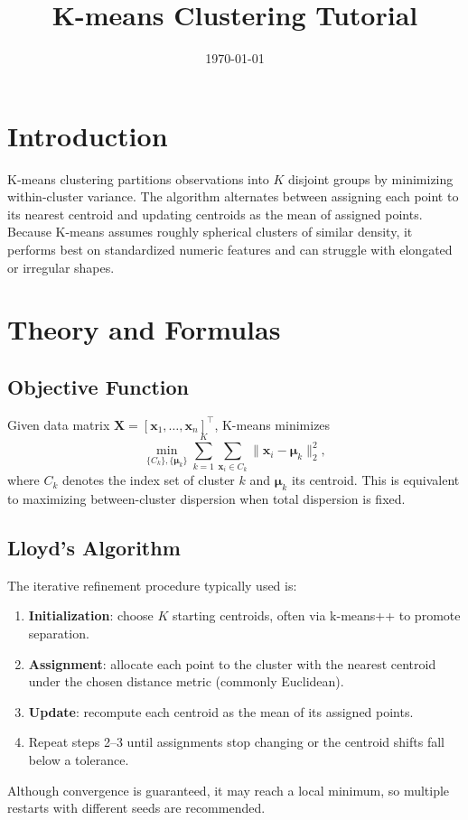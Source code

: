 ﻿\documentclass[12pt]{article}
\title{K-means Clustering Tutorial}
\author{}
\date{\today}
\begin{document}
\maketitle

\section{Introduction}
K-means clustering partitions observations into \(K\) disjoint groups by minimizing within-cluster variance. The algorithm alternates between assigning each point to its nearest centroid and updating centroids as the mean of assigned points. Because K-means assumes roughly spherical clusters of similar density, it performs best on standardized numeric features and can struggle with elongated or irregular shapes.

\section{Theory and Formulas}
\subsection{Objective Function}
Given data matrix \(\mathbf{X} = [\mathbf{x}_1,\dots,\mathbf{x}_n]^\top\), K-means minimizes
\begin{equation}
\min_{\{C_k\},\{\bm{\mu}_k\}} \sum_{k=1}^K \sum_{\mathbf{x}_i \in C_k} \lVert \mathbf{x}_i - \bm{\mu}_k \rVert_2^2,
\end{equation}
where \(C_k\) denotes the index set of cluster \(k\) and \(\bm{\mu}_k\) its centroid. This is equivalent to maximizing between-cluster dispersion when total dispersion is fixed.

\subsection{Lloyd's Algorithm}
The iterative refinement procedure typically used is:
\begin{enumerate}
  \item \textbf{Initialization}: choose \(K\) starting centroids, often via k-means++ to promote separation.
  \item \textbf{Assignment}: allocate each point to the cluster with the nearest centroid under the chosen distance metric (commonly Euclidean).
  \item \textbf{Update}: recompute each centroid as the mean of its assigned points.
  \item Repeat steps 2--3 until assignments stop changing or the centroid shifts fall below a tolerance.
\end{enumerate}
Although convergence is guaranteed, it may reach a local minimum, so multiple restarts with different seeds are recommended.
\end{document}
